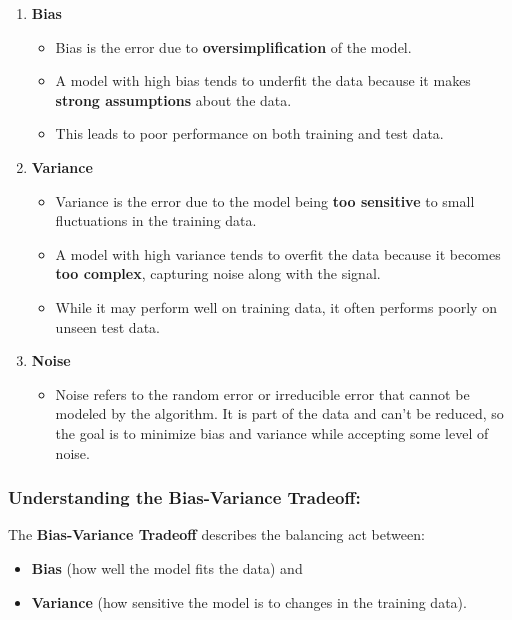 \documentclass[12pt]{book}
\begin{document}
\begin{enumerate}
    \item \textbf{Bias}
    \begin{itemize}
        \item [-] Bias is the error due to \textbf{oversimplification} of the model.
        \item [-] A model with high bias tends to underfit the data because it makes \textbf{strong assumptions} about the data.
        \item [-] This leads to poor performance on both training and test data.
    \end{itemize}
    \item \textbf{Variance}
    \begin{itemize}
        \item [-] Variance is the error due to the model being \textbf{too sensitive} to small fluctuations in the training data.
        \item [-] A model with high variance tends to overfit the data because it becomes \textbf{too complex}, capturing noise along with the signal.
        \item [-] While it may perform well on training data, it often performs poorly on unseen test data.
    \end{itemize}
    \item \textbf{Noise}
    \begin{itemize}
        \item [-] Noise refers to the random error or irreducible error that cannot be modeled by the algorithm. It is part of the data and can’t be reduced, so the goal is to minimize bias and variance while accepting some level of noise.
    \end{itemize}
\end{enumerate}


\subsubsection*{Understanding the Bias-Variance Tradeoff:}

The \textbf{Bias-Variance Tradeoff} describes the balancing act between:

\begin{itemize}
    \item [-] \textbf{Bias} (how well the model fits the data) and 
    \item [-] \textbf{Variance} (how sensitive the model is to changes in the training data).

\end{itemize}
\end{document}
